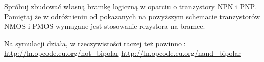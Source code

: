 \documentclass{pdfBooklets}
\begin{document}
\begin{Zadanie}{}{}
Spróbuj zbudować własną bramkę logiczną w oparciu o tranzystory NPN i PNP. Pamiętaj że w odróżnieniu od pokazanych na powyższym schemacie tranzystorów NMOS i PMOS wymagane jest stosowanie rezystora na bramce.

\begin{teacherOnly}
Na symulacji działa, w rzeczywistości raczej też powinno🙂: \url{http://ln.opcode.eu.org/not_bipolar}
\url{http://ln.opcode.eu.org/nand_bipolar}
\end{teacherOnly}
\end{Zadanie}

\end{document}
